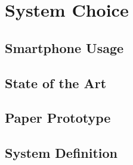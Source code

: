 \chapter{System Choice}


\section{Smartphone Usage}\label{sub:smartphone_usage}


\section{State of the Art}
\label{StateOfTheArt}


\section{Paper Prototype}


\section{System Definition}\label{systemDefinition}

